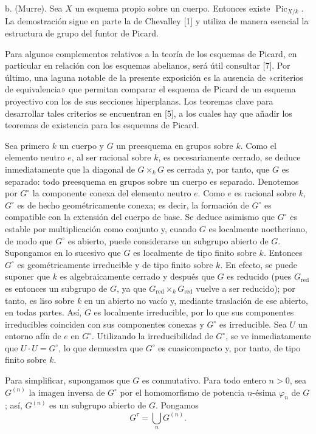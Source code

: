\noindent b. (Murre). Sea $X$ un esquema propio sobre un cuerpo. Entonces
existe $\operatorname{Pic}_{X/k}$. La demostración sigue en parte la de
Chevalley [1] y utiliza de manera esencial la estructura de grupo del funtor de
Picard.

Para algunos complementos relativos a la teoría de los esquemas de Picard, en
particular en relación con los esquemas abelianos, será útil consultar [7]. Por
último, una laguna notable de la presente exposición es la ausencia de
«criterios de equivalencia» que permitan comparar el esquema de Picard de un
esquema proyectivo con los de sus secciones hiperplanas. Los teoremas clave
para desarrollar tales criterios se encuentran en [5], a los cuales hay que
añadir los teoremas de existencia para los esquemas de Picard.


Sea primero $k$ un cuerpo y $G$ un preesquema en grupos sobre $k$. Como el
elemento neutro $e$, al ser racional sobre $k$, es necesariamente cerrado, se
deduce inmediatamente que la diagonal de $G\times_kG$ es cerrada y, por tanto,
que $G$ es separado: todo preesquema en grupos sobre un cuerpo es separado.
Denotemos por $G^\circ$ la componente conexa del elemento neutro $e$. Como $e$
es racional sobre $k$, $G^\circ$ es de hecho geométricamente conexa; es decir,
la formación de $G^\circ$ es compatible con la extensión del cuerpo de base.
Se deduce asimismo que $G^\circ$ es estable por multiplicación como conjunto y,
cuando $G$ es localmente noetheriano, de modo que $G^\circ$ es abierto, puede
considerarse un subgrupo abierto de $G$. Supongamos en lo sucesivo que $G$ es
localmente de tipo finito sobre $k$. Entonces $G^\circ$ es geométricamente
irreducible y de tipo finito sobre $k$. En efecto, se puede suponer que $k$ es
algebraicamente cerrado y después que $G$ es reducido (pues
$G_{\mathrm{red}}$ es entonces un subgrupo de $G$, ya que
$G_{\mathrm{red}}\times_kG_{\mathrm{red}}$ vuelve a ser reducido); por tanto,
es liso sobre $k$ en un abierto no vacío y, mediante traslación de ese
abierto, en todas partes. Así, $G$ es localmente irreducible, por lo que sus
componentes irreducibles coinciden con sus componentes conexas y $G^\circ$ es
irreducible. Sea $U$ un entorno afín de $e$ en $G^\circ$. Utilizando la
irreducibilidad de $G^\circ$, se ve inmediatamente que $U\cdot U=G^\circ$, lo
que demuestra que $G^\circ$ es cuasicompacto y, por tanto, de tipo finito sobre
$k$.

Para simplificar, supongamos que $G$ es conmutativo. Para todo entero $n>0$,
sea $G^{(n)}$ la imagen inversa de $G^\circ$ por el homomorfismo de potencia
$n$-ésima $\varphi_n$ de $G$; así, $G^{(n)}$ es un subgrupo abierto de $G$.
Pongamos
\[
G^\tau=\bigcup_nG^{(n)}.
\]

